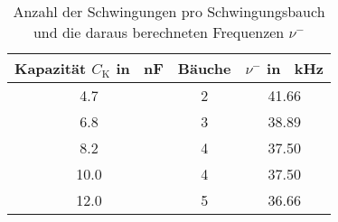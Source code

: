 \begin{table}[h!]
\begin{center}
\begin{tabular}{c | c | c}
	Kapazität $C_\text{K}$ in \SI{}{\nano\farad} & Bäuche & $\nu^-$ in \SI{}{\kilo\hertz} \\
	\hline
	4.7 & 2 & 41.66 \\
	6.8 & 3 & 38.89 \\
	8.2 & 4 & 37.50 \\
	10.0 & 4 & 37.50 \\
	12.0 & 5 & 36.66 \\
\end{tabular}
\end{center}
\caption{Anzahl der Schwingungen pro Schwingungsbauch und die daraus berechneten Frequenzen $\nu^-$}
\label{fig:Freq_Bauch}
\end{table}